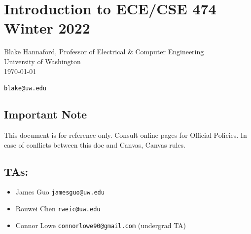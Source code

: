 %
%
%
%
%
%
%
%
%
%
\section{Introduction to ECE/CSE 474   Winter 2022}


Blake Hannaford, Professor of Electrical \& Computer Engineering\\
University of Washington\\
\today

{\tt blake@uw.edu}


\subsection{Important Note}
This document is for reference only. Consult online pages for Official Policies.  In case of conflicts between this doc and Canvas, Canvas rules. 



\subsection{TAs: } 
\begin{itemize}
    \item James Guo {\tt jamesguo@uw.edu}
    \item Rouwei Chen {\tt rweic@uw.edu}
    \item Connor Lowe {\tt connorlowe90@gmail.com} (undergrad TA)
\end{itemize}


